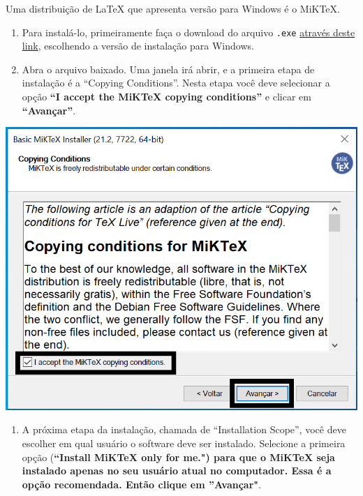 \documentclass[
]{book}
\providecommand{\tightlist}{%
  \setlength{\itemsep}{0pt}\setlength{\parskip}{0pt}}
\begin{document}
Uma distribuição de LaTeX que apresenta versão para Windows é o MiKTeX.

\begin{enumerate}
\def\labelenumi{\arabic{enumi}.}
\item
  Para instalá-lo, primeiramente faça o download do arquivo \texttt{.exe} \href{https://MiKTeX.org/download\#win}{através deste link}, escolhendo a versão de instalação para Windows.
\item
  Abra o arquivo baixado. Uma janela irá abrir, e a primeira etapa de instalação é a ``Copying Conditions''. Nesta etapa você deve selecionar a opção \textbf{``I accept the MiKTeX copying conditions''} e clicar em \textbf{``Avançar''}.
\end{enumerate}

\begin{center}\includegraphics[width=0.8\linewidth]{img/instalacao/miktex_windows/win_miktex1} \end{center}

\begin{enumerate}
\def\labelenumi{\arabic{enumi}.}
\setcounter{enumi}{2}
\tightlist
\item
  A próxima etapa da instalação, chamada de ``Installation Scope'', você deve escolher em qual usuário o software deve ser instalado. Selecione a primeira opção (\textbf{``Install MiKTeX only for me.\textbf{") para que o MiKTeX seja instalado apenas no seu usuário atual no computador. Essa é a opção recomendada. Então clique em }''Avançar"}.
\end{enumerate}
\end{document}
